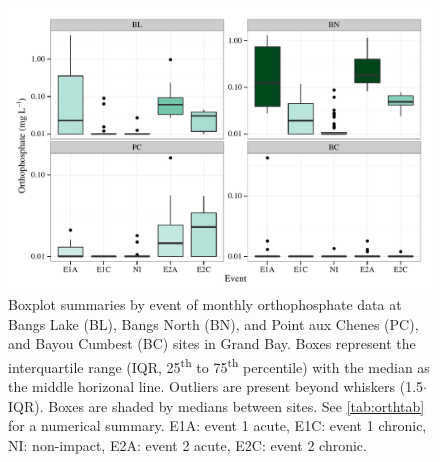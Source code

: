 \documentclass[letterpaper,12pt]{article}\usepackage[]{graphicx}\usepackage[]{color}
\makeatletter
\def\maxwidth{ %
  \ifdim\Gin@nat@width>\linewidth
    \linewidth
  \else
    \Gin@nat@width
  \fi
}
\makeatother
\begin{document}
\begin{figure}[!ht]

{\centering \includegraphics[width=\maxwidth]{figs/orthfig-1} 

}

\caption{Boxplot summaries by event of monthly orthophosphate data at Bangs Lake (BL), Bangs North (BN), and Point aux Chenes (PC), and Bayou Cumbest (BC) sites in Grand Bay.  Boxes represent the interquartile range (IQR, 25\textsuperscript{th} to 75\textsuperscript{th} percentile) with the median as the middle horizonal line.  Outliers are present beyond whiskers (1.5$\cdot$IQR). Boxes are shaded by medians between sites.  See \cref{tab:orthtab} for a numerical summary. E1A: event 1 acute, E1C: event 1 chronic, NI: non-impact, E2A: event 2 acute, E2C: event 2 chronic.}\label{fig:orthfig}
\end{figure}


\clearpage
\end{document}
